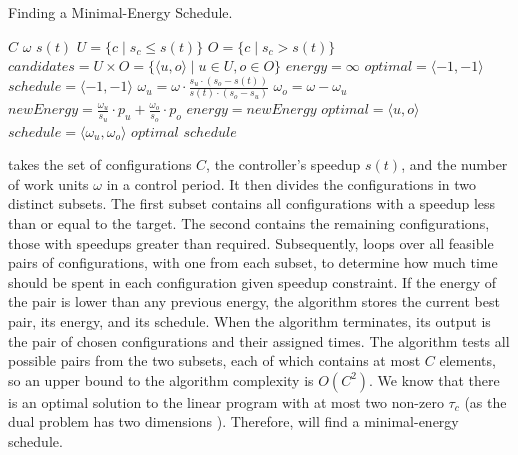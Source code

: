 \begin{algorithm}[t]
  \caption{Finding a Minimal-Energy Schedule.}
  \begin{algorithmic}
    \footnotesize
    \Require $C$ 
    \Require $\omega$ 
    \Require $s(t)$ 
    \State $U = \{c \mid s_c \le s(t) \}$
    \State $O = \{c \mid s_c > s(t)\}$
    \State $candidates = U \times O = \{\langle u, o \rangle \mid u \in U, o \in O\}$
    \State $energy = \infty$
    \State $optimal = \langle -1, -1 \rangle$
    \State $schedule = \langle -1, -1 \rangle$ \newline
     
    \State $\omega_u = \omega \cdot \frac{s_u \cdot (s_o - s(t))}{s(t) \cdot (s_o - s_u)}$ 
    \State $\omega_o = \omega - \omega_u$
    \State $newEnergy = \frac{\omega_u}{s_u} \cdot p_u + \frac{\omega_o}{s_o} \cdot p_o$ 
     
    \State $energy = newEnergy$
    \State $optimal = \langle u, o \rangle$
    \State $schedule = \langle \omega_u,\omega_o \rangle$
    \EndIf
    \EndFor \newline \newline
    \Return $optimal$  \newline
    \Return $schedule$ 
  \end{algorithmic}
  \label{algo:poet-optimal}
\end{algorithm}

 takes the set of configurations $C$, the controller's speedup $s(t)$, and the number of work units $\omega$ in a control period.
It then divides the configurations in two distinct subsets.
The first subset contains all configurations with a speedup less than or equal to the target.
The second contains the remaining configurations, \ie those with speedups greater than required.
Subsequently,  loops over all feasible pairs of configurations, with one from each subset, to determine how much time should be spent in each configuration given speedup constraint.
If the energy of the pair is lower than any previous energy, the algorithm stores the current best pair, its energy, and its schedule.
When the algorithm terminates, its output is the pair of chosen configurations and their assigned times.
The algorithm tests all possible pairs from the two subsets, each of which contains at most $C$ elements, so an upper bound to the algorithm complexity is $O(C^2)$.
We know that there is an optimal solution to the linear program with at most two non-zero $\tau_c$ (as the dual problem has two dimensions \cite{LP}).
Therefore,  will find a minimal-energy schedule.


